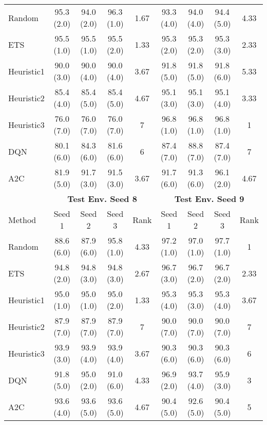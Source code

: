 \begin{table}[t]
{\begin{tabular}{lcccccccc}
Random     & 95.3 (2.0)  & 94.0 (2.0)  & 96.3 (1.0) & 1.67 & 93.3 (4.0)  & 94.0 (4.0)  & 94.4 (5.0) & 4.33 \\
ETS        & 95.5 (1.0)  & 95.5 (1.0)  & 95.5 (2.0) & 1.33 & 95.3 (2.0)  & 95.3 (2.0)  & 95.3 (3.0) & 2.33 \\
Heuristic1 & 90.0 (3.0)  & 90.0 (4.0)  & 90.0 (4.0) & 3.67 & 91.8 (5.0)  & 91.8 (5.0)  & 91.8 (6.0) & 5.33 \\
Heuristic2 & 85.4 (4.0)  & 85.4 (5.0)  & 85.4 (5.0) & 4.67 & 95.1 (3.0)  & 95.1 (3.0)  & 95.1 (4.0) & 3.33 \\
Heuristic3 & 76.0 (7.0)  & 76.0 (7.0)  & 76.0 (7.0) & 7    & 96.8 (1.0)  & 96.8 (1.0)  & 96.8 (1.0) & 1    \\
DQN        & 80.1 (6.0)  & 84.3 (6.0)  & 81.6 (6.0) & 6    & 87.4 (7.0)  & 88.8 (7.0)  & 87.4 (7.0) & 7    \\
A2C        & 81.9 (5.0)  & 91.7 (3.0)  & 91.5 (3.0) & 3.67 & 91.7 (6.0)  & 91.3 (6.0)  & 96.1 (2.0) & 4.67 \\ \midrule
\textbf{}  & \multicolumn{4}{c}{\textbf{Test Env. Seed 8}} & \multicolumn{4}{c}{\textbf{Test Env. Seed 9}} \\
    \cmidrule(lr){2-5} \cmidrule(lr){6-9} 
Method     & Seed 1      & Seed 2      & Seed 3     & Rank & Seed 1      & Seed 2      & Seed 3     & Rank \\ \midrule
Random     & 88.6 (6.0)  & 87.9 (6.0)  & 95.8 (1.0) & 4.33 & 97.2 (1.0)  & 97.0 (1.0)  & 97.7 (1.0) & 1    \\
ETS        & 94.8 (2.0)  & 94.8 (3.0)  & 94.8 (3.0) & 2.67 & 96.7 (3.0)  & 96.7 (2.0)  & 96.7 (2.0) & 2.33 \\
Heuristic1 & 95.0 (1.0)  & 95.0 (1.0)  & 95.0 (2.0) & 1.33 & 95.3 (4.0)  & 95.3 (3.0)  & 95.3 (4.0) & 3.67 \\
Heuristic2 & 87.9 (7.0)  & 87.9 (7.0)  & 87.9 (7.0) & 7    & 90.0 (7.0)  & 90.0 (7.0)  & 90.0 (7.0) & 7    \\
Heuristic3 & 93.9 (3.0)  & 93.9 (4.0)  & 93.9 (4.0) & 3.67 & 90.3 (6.0)  & 90.3 (6.0)  & 90.3 (6.0) & 6    \\
DQN        & 91.8 (5.0)  & 95.0 (2.0)  & 91.0 (6.0) & 4.33 & 96.9 (2.0)  & 93.7 (4.0)  & 95.9 (3.0) & 3    \\
A2C        & 93.6 (4.0)  & 93.6 (5.0)  & 93.6 (5.0) & 4.67 & 90.4 (5.0)  & 92.6 (5.0)  & 90.4 (5.0) & 5 \\
\bottomrule
\end{tabular}
}
\end{table}